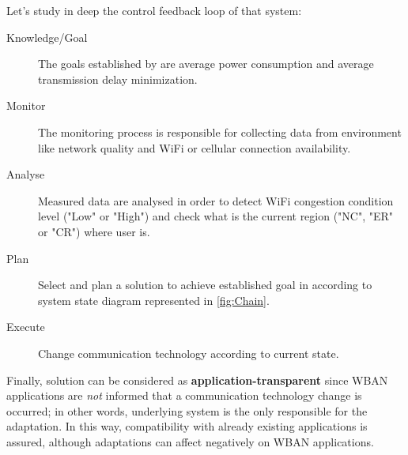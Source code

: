 \documentclass[sigchi]{acmart}
\begin{document}
Let's study in deep the control feedback loop of that system:
\begin{description}

\item[Knowledge/Goal] The goals established by \citet{MSAReport} are average power consumption and average transmission delay minimization.

\item[Monitor] The monitoring process is responsible for collecting data from environment like network quality and WiFi or cellular connection availability. 

\item[Analyse] Measured data are analysed in order to detect WiFi congestion condition level ("Low" or "High") and check what is the current region ("NC", "ER" or "CR") where user is.

\item[Plan] Select and plan a solution to achieve established goal in according to system state diagram represented in \ref{fig:Chain}. 

\item[Execute] Change communication technology according to current state.

\end{description}

Finally, \citet{MSAReport} solution can be considered as \textbf{application-transparent} since WBAN applications are \textit{not} informed that a communication technology change is occurred; in other words, underlying system is the only responsible for the adaptation. In this way, compatibility with already existing applications is assured, although adaptations can affect negatively on WBAN applications. 
\end{document}
